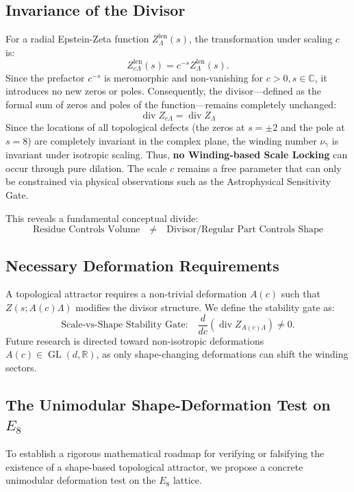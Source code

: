 \documentclass[11pt,a4paper]{article}
\theoremstyle{definition}
\begin{document}
	\subsection{Invariance of the Divisor}
	For a radial Epstein-Zeta function $Z_\Lambda^{\mathrm{len}}(s)$, the transformation under scaling $c$ is:
	\[
	Z_{c\Lambda}^{\mathrm{len}}(s) = c^{-s}Z_\Lambda^{\mathrm{len}}(s).
	\]
	Since the prefactor $c^{-s}$ is meromorphic and non-vanishing for $c>0, s \in \mathbb{C}$, it introduces no new zeros or poles. Consequently, the divisor---defined as the formal sum of zeros and poles of the function---remains completely unchanged:
	\[
	\boxed{
		\operatorname{div} Z_{c\Lambda} = \operatorname{div} Z_{\Lambda}
	}
	\]
	Since the locations of all topological defects (the zeros at $s = \pm 2$ and the pole at $s = 8$) are completely invariant in the complex plane, the winding number $\nu_\gamma$ is invariant under isotropic scaling. Thus, \textbf{no Winding-based Scale Locking} can occur through pure dilation. The scale $c$ remains a free parameter that can only be constrained via physical observations such as the Astrophysical Sensitivity Gate.
	
	This reveals a fundamental conceptual divide:
	\[
	\boxed{\text{Residue Controls Volume} \quad \neq \quad \text{Divisor/Regular Part Controls Shape}}
	\]
	
	\subsection{Necessary Deformation Requirements}
	A topological attractor requires a non-trivial deformation $A(c)$ such that $Z(s; A(c)\Lambda)$ modifies the divisor structure. We define the stability gate as:
	\[
	\text{Scale-vs-Shape Stability Gate:} \quad \frac{d}{dc} (\operatorname{div} Z_{A(c)\Lambda}) \neq 0.
	\]
	Future research is directed toward non-isotropic deformations $A(c) \in \operatorname{GL}(d, \mathbb{R})$, as only shape-changing deformations can shift the winding sectors.
	
	\subsection{The Unimodular Shape-Deformation Test on $E_8$}
	To establish a rigorous mathematical roadmap for verifying or falsifying the existence of a shape-based topological attractor, we propose a concrete unimodular deformation test on the $E_8$ lattice.
	
\end{document}
